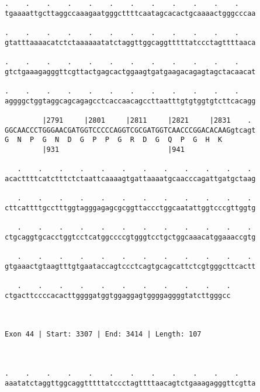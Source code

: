 \documentclass{article}
\begin{document}
\begin{Verbatim}
.    .    .    .    .    .    .    .    .    .    .    .    
tgaaaattgcttaggccaaagaatgggcttttcaatagcacactgcaaaactgggcccaa
                                                            
.    .    .    .    .    .    .    .    .    .    .    .    
gtatttaaaacatctctaaaaaatatctaggttggcaggtttttatccctagttttaaca
                                                            
.    .    .    .    .    .    .    .    .    .    .    .    
gtctgaaagagggttcgttactgagcactggaagtgatgaagacagagtagctacaacat
                                                            
.    .    .    .    .    .    .    .    .    .    .    .    
aggggctggtaggcagcagagcctcaccaacagccttaatttgtgtggtgtcttcacagg
                                                            
         |2791     |2801     |2811     |2821     |2831    . 
GGCAACCCTGGGAACGATGGTCCCCCAGGTCGCGATGGTCAACCCGGACACAAGgtcagt
G  N  P  G  N  D  G  P  P  G  R  D  G  Q  P  G  H  K        
         |931                          |941                 
  
   .    .    .    .    .    .    .    .    .    .    .    . 
acacttttcatctttctctaattcaaaagtgattaaaatgcaacccagattgatgctaag
                                                            
   .    .    .    .    .    .    .    .    .    .    .    . 
cttcattttgcctttggtagggagagcgcggttaccctggcaatattggtcccgttggtg
                                                            
   .    .    .    .    .    .    .    .    .    .    .    . 
ctgcaggtgcacctggtcctcatggccccgtgggtcctgctggcaaacatggaaaccgtg
                                                            
   .    .    .    .    .    .    .    .    .    .    .    . 
gtgaaactgtaagtttgtgaataccagtccctcagtgcagcattctcgtgggcttcactt
                                                            
   .    .    .    .    .    .    .    .    .    .    .
ctgacttccccacacttggggatggtggaggagtggggaggggtatcttgggcc
                                                      
                                                      
 
Exon 44 | Start: 3307 | End: 3414 | Length: 107



.    .    .    .    .    .    .    .    .    .    .    .    
aaatatctaggttggcaggtttttatccctagttttaacagtctgaaagagggttcgtta
                                                            

\end{Verbatim}
\end{document}
